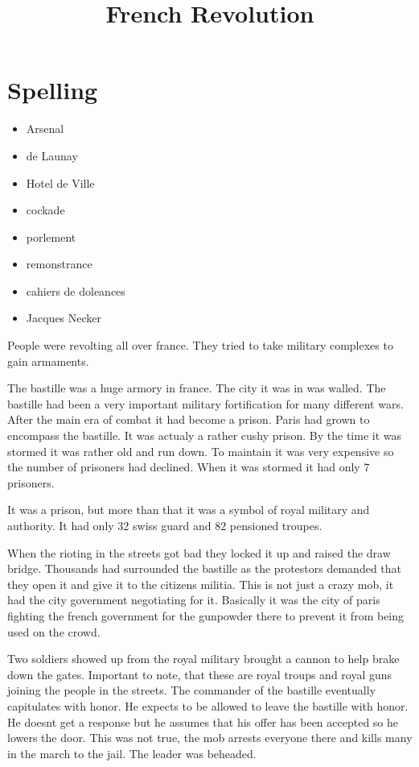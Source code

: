 \documentclass{article}
\begin{document}
\title{French Revolution}
\section*{Spelling}
\label{sec:spelling}
\begin{itemize}
	\item Arsenal
	\item de Launay
	\item Hotel de Ville
	\item cockade
	\item porlement
	\item remonstrance
	\item cahiers de doleances
	\item Jacques Necker
\end{itemize}

\maketitle
People were revolting all over france. They tried to take military complexes to gain armaments.

The bastille was a huge armory in france. The city it was in was walled. The bastille had been a very important military fortification for many different wars. After the main era of combat it had become a prison. Paris had grown to encompass the bastille. It was actualy a rather cushy prison. By the time it was stormed it was rather old and run down. To maintain it was very expensive so the number of prisoners had declined. When it was stormed it had only 7 prisoners.

It was a prison, but more than that it was a symbol of royal military and authority. It had only 32 swiss guard and 82 pensioned troupes.

When the rioting in the streets got bad they locked it up and raised the draw bridge. Thousands had surrounded the bastille as the protestors demanded that they open it and give it to the citizens militia. This is not just a crazy mob, it had the city government negotiating for it. Basically it was the city of paris fighting the french government for the gunpowder there to prevent it from being used on the crowd.

Two soldiers showed up from the royal military brought a cannon to help brake down the gates. Important to note, that these are royal troups and royal guns joining the people in the streets. The commander of the bastille eventually capitulates with honor. He expects to be allowed to leave the bastille with honor. He doesnt get a response but he assumes that his offer has been accepted so he lowers the door. This was not true, the mob arrests everyone there and kills many in the march to the jail. The leader was beheaded.
\end{document}
